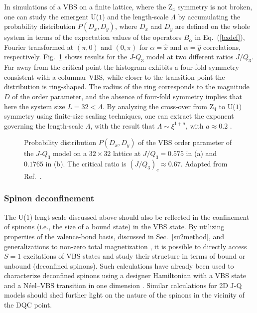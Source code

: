 \documentclass[range]{ar2e}
\begin{document}
In simulations of a VBS on a finite lattice, where the Z$_4$ symmetry is not broken, one can study the emergent U($1$) and the length-scale $\Lambda$ by 
accumulating the probability distribution $P(D_x,D_y)$, where $D_x$ and $D_y$ are defined on the whole system in terms of the expectation values of the 
operators $B_\alpha$ in Eq.~(\ref{bxdef}), Fourier transformed at $(\pi,0)$ and $(0,\pi)$ for $\alpha=\hat x$ and $\alpha=\hat y$ correlations, respectively.
Fig.~\ref{jq3histo} shows results for the $J$-$Q_3$ model at two different ratios $J/Q_3$. Far away from the critical point the histogram exhibits a four-fold
symmetry consistent with a columnar VBS, while closer to the transition point the distribution is ring-shaped. The radius of the ring corresponds
to the magnitude $D$ of the order parameter, and the absence of four-fold symmetry implies that here the system size $L=32 < \Lambda$. By analyzing the
cross-over from Z$_4$ to U($1$) symmetry using finite-size scaling techniques, one can extract the exponent governing the length-scale $\Lambda$, with 
the result that $\Lambda \sim \xi^{1+a}$, with $a \approx 0.2$ \cite{lou2009:sun}.


\begin{figure}
\centerline{}
  \caption{Probability distribution $P(D_x,D_y)$ of the VBS order parameter of the $J$-$Q_3$ model on a $32\times 32$
           lattice at $J/Q_3 = 0.575$ in (a) and $0.1765$ in (b). The critical ratio is $(J/Q_3)_c \approx 0.67$. Adapted
           from Ref.~\cite{lou2009:sun}.}  
\label{jq3histo}
\end{figure}

\subsubsection{Spinon deconfinement}

The U($1$) lengt scale discussed above should also be reflected in the confinement of spinons (i.e., the size of a bound state) in the VBS state. By utilizing 
properties of the valence-bond basis, discussed in Sec.~\ref{su2method}, and generalizations to non-zero total magnetization \cite{Banerjee10b,Wang10}, it is 
possible to directly access $S=1$ excitations of VBS states and study their structure in terms of bound or unbound (deconfined spinons). Such calculations have 
already been used to characterize deconfined spinons using a designer Hamiltonian with a VBS state and a N\'eel--VBS transition in one dimension \cite{Tang11a}. 
Similar calculations for 2D J-Q models should shed further light on the nature of the spinons in the vicinity of the DQC point.
\end{document}
